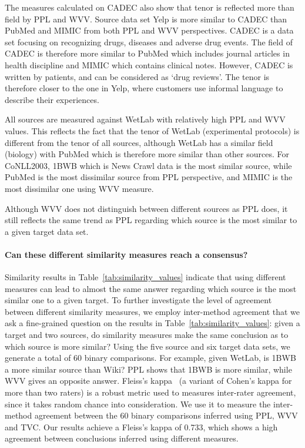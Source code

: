 \documentclass[11pt,a4paper]{article}
\begin{document}
The measures calculated on CADEC also show that tenor is reflected more than field by PPL and WVV. 
Source data set Yelp is more similar to CADEC than PubMed and MIMIC from both PPL and WVV perspectives. 
CADEC is a data set focusing on recognizing drugs, diseases and adverse drug events. 
The field of CADEC is therefore more similar to PubMed which includes journal articles in health discipline and MIMIC which contains clinical notes. However, CADEC is written by patients, and can be considered as `drug reviews'. The tenor is therefore closer to the one in Yelp, where customers use informal language to describe their experiences. 

All sources are measured against WetLab with relatively high PPL and WVV values. 
This reflects the fact that the tenor of WetLab (experimental protocols) is different from the tenor of all sources, although WetLab has a similar field (biology) with PubMed which is therefore more similar than other sources. 
For CoNLL2003, 1BWB which is News Crawl data is the most similar source, while PubMed is the most dissimilar source from PPL perspective, and MIMIC is the most dissimilar one using WVV measure. 

Although WVV does not distinguish between different sources as PPL does, it still reflects the same trend as PPL regarding which source is the most similar to a given target data set.

\paragraph{Can these different similarity measures reach a consensus?}
Similarity results in Table~\ref{tab:similarity_values} indicate that using different measures can lead to almost the same answer regarding which source is the most similar one to a given target. 
To further investigate the level of agreement between different similarity measures, we employ inter-method agreement that we ask a fine-grained question on the results in Table~\ref{tab:similarity_values}: given a target and two sources, do similarity measures make the same conclusion as to which source is more similar? 
Using the five source and six target data sets, we generate a total of 60 binary comparisons.
For example, given WetLab, is 1BWB a more similar source than Wiki? 
PPL shows that 1BWB is more similar, while WVV gives an opposite answer. 
Fleiss's kappa~\cite{Fleiss:1971} (a variant of Cohen's kappa for more than two raters) is a robust metric used to measures inter-rater agreement, since it takes random chance into consideration. 
We use it to measure the inter-method agreement between the 60 binary comparisons inferred using PPL, WVV and TVC. 
Our results achieve a Fleiss's kappa of 0.733, which shows a high agreement between conclusions inferred using different measures.
\end{document}

